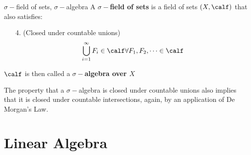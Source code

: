 \documentclass[a4paper, 10pt]{article}
\begin{document}
\begin{definition} {\(\sigma-\)field of sets, \(\sigma-\)algebra}
    A \textbf{\(\sigma-\)field of sets} is a field of sets \((X, \calf)\) that also satisfies:
    \begin{enumerate}
        \item[4.] (Closed under countable unions) \[
                \bigcup_{i=1}^{\infty} F_i \in \calf \forall F_1, F_2, \dots \in \calf
            \]
    \end{enumerate}
    \(\calf\) is then called a \textbf{\(\sigma-\)algebra over \(X\)}
\end{definition}
\begin{remark}
    The property that a \(\sigma-\)algebra is closed under countable unions also implies that it is closed under countable intersections, again, by an application of De Morgan's Law.
\end{remark}

\section{Linear Algebra}
\end{document}
